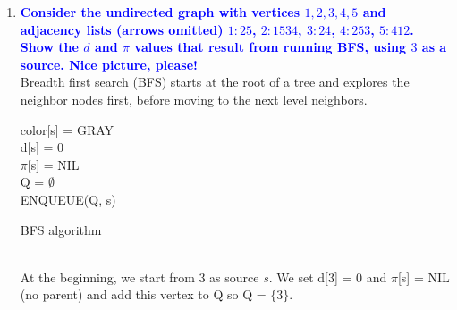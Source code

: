 \documentclass[11pt]{article}
\begin{document}
\begin{enumerate}
\item \textbf{\textcolor{blue}{Consider the undirected graph with vertices $1,2,3,4,5$ and adjacency
lists (arrows omitted) $1:25$, $2:1534$, $3:24$, $4:253$, $5:412$.  Show the $d$ and
$\pi$ values that result from running BFS, using $3$ as a source.  Nice picture, please!}}
    \\ Breadth first search (BFS) starts at the root of a tree and explores the neighbor nodes first, before moving to the next level neighbors.
    \begin{algorithm}
        color[s] = GRAY \\
        d[s] = 0 \\
        $\pi$[s] = NIL \\
        Q = $\emptyset$ \\
        ENQUEUE(Q, s) \\
    \caption{BFS algorithm}
    \end{algorithm}
    \\ At the beginning, we start from 3 as source $s$. We set d[3] = 0 and $\pi$[s] = NIL (no parent) and add this vertex to Q so Q = $\{3\}$. \\
\end{enumerate}
\end{document}
